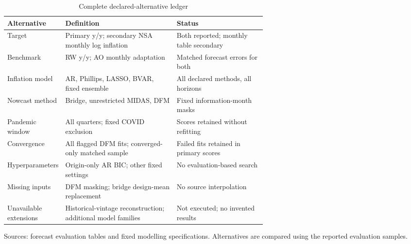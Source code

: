 \begin{table}[htbp]
\centering
\footnotesize
\caption{Complete declared-alternative ledger}
\begin{tabularx}{\linewidth}{p{0.19\linewidth}p{0.43\linewidth}X}
\toprule
Alternative & Definition & Status \\
\midrule
Target & Primary y/y; secondary NSA monthly log inflation & Both reported; monthly table secondary \\
Benchmark & RW y/y; AO monthly adaptation & Matched forecast errors for both \\
Inflation model & AR, Phillips, LASSO, BVAR, fixed ensemble & All declared methods, all horizons \\
Nowcast method & Bridge, unrestricted MIDAS, DFM & Fixed information-month masks \\
Pandemic window & All quarters; fixed COVID exclusion & Scores retained without refitting \\
Convergence & All flagged DFM fits; converged-only matched sample & Failed fits retained in primary scores \\
Hyperparameters & Origin-only AR BIC; other fixed settings & No evaluation-based search \\
Missing inputs & DFM masking; bridge design-mean replacement & No source interpolation \\
Unavailable extensions & Historical-vintage reconstruction; additional model families & Not executed; no invented results \\
\bottomrule
\end{tabularx}
\par\vspace{3pt}\begin{minipage}{\linewidth}\footnotesize Sources: forecast evaluation tables and fixed modelling specifications.\allowbreak{} Alternatives are compared using the reported evaluation samples.\allowbreak{}\end{minipage}
\end{table}

